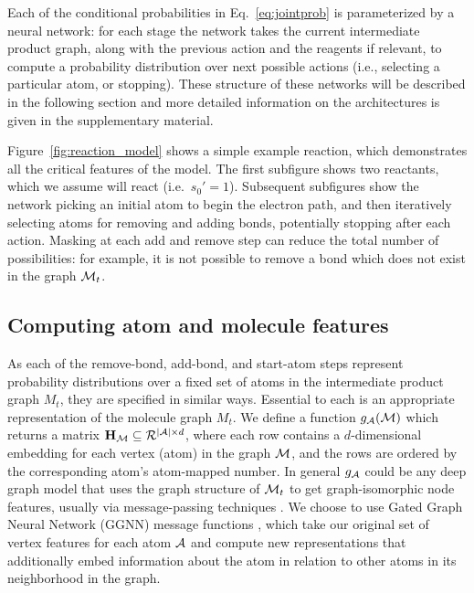 Each of the conditional probabilities in Eq.~\eqref{eq:jointprob} is parameterized by a neural network:
for each stage the network takes the current intermediate product graph, 
along with the previous action and the reagents if relevant, 
to compute a probability distribution over next possible actions (i.e., selecting a particular atom, or stopping).
These structure of these networks will be described in the following section and more detailed information on the architectures is given in the supplementary material.

Figure~\ref{fig:reaction_model} shows a simple example reaction, which demonstrates all the critical features of the model.
The first subfigure shows two reactants, which we assume will react (i.e.\ $s_0' = 1$).
Subsequent subfigures show the network picking an initial atom to begin the electron path,
and then iteratively selecting atoms for removing and adding bonds, potentially stopping after each action.
Masking at each add and remove step can reduce the total number of possibilities: 
for example, it is not possible to remove a bond which does not exist in the graph ${\mathcal{M}}_t$.

\subsection{Computing atom and molecule features}


As each of the remove-bond, add-bond, and start-atom steps represent probability distributions over a fixed set of atoms in the intermediate product graph $M_t$, they are specified in similar ways. 
Essential to each is an appropriate representation of the molecule graph $M_t$.
We define a function $g_{{\mathcal{A}}} ({\mathcal{M}})$ which returns a matrix ${\mathbf{H}}_{{\mathcal{M}}} \subseteq {\mathcal{R}}^{|{\mathcal{A}}|\times d}$, where each row contains a $d$-dimensional embedding for each vertex (atom) in the graph ${\mathcal{M}}$, and the rows are ordered by the corresponding atom's atom-mapped number.
In general $g_{{\mathcal{A}}}$ could be any deep graph model that uses the graph structure of ${\mathcal{M}}_t$ to get graph-isomorphic node features, usually via message-passing techniques \citep{gilmer2017neural}. 
We choose to use Gated Graph Neural Network (GGNN) message functions \citep{li2016gated},
which take our original set of vertex features for each atom ${\mathcal{A}}$ and compute new representations that
additionally embed information about the atom in relation to other atoms in its neighborhood in the graph.

